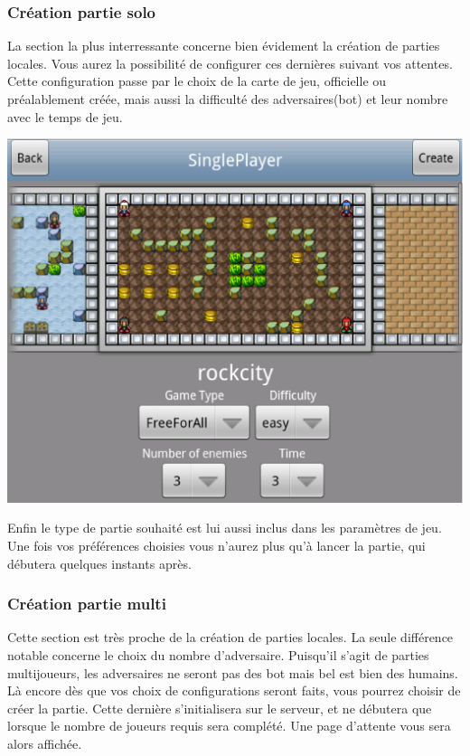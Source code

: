 	\subsubsection{Création partie solo}
	La section la plus interressante concerne bien évidement la création de parties
	locales. Vous aurez la possibilité de configurer ces dernières suivant vos
	attentes. Cette configuration passe par le choix de la carte de jeu, officielle
	ou préalablement créée, mais aussi la difficulté des adversaires(\gls{bot})
	et leur nombre avec le temps de jeu.
		\begin{center}						
			\includegraphics[scale=0.4]{Developpement/Img/7.eps}
		\end{center} 
	Enfin le type de partie souhaité est lui
	aussi inclus dans les paramètres de jeu. Une fois vos préférences choisies
	vous n'aurez plus qu'à lancer la partie, qui débutera quelques instants après.
	
	
	\subsubsection{Création partie multi}
	Cette section est très proche de la création de parties locales. La seule
	différence notable concerne le choix du nombre d'adversaire. Puisqu'il s'agit
	de parties multijoueurs, les adversaires ne seront pas des \gls{bot} mais bel
	est bien des humains. 
	Là encore dès que vos choix de configurations seront faits, vous pourrez
	choisir de créer la partie. Cette dernière s'initialisera sur le serveur, et ne
	débutera que lorsque le nombre de joueurs requis sera complété. Une page
	d'attente vous sera alors affichée.
	
